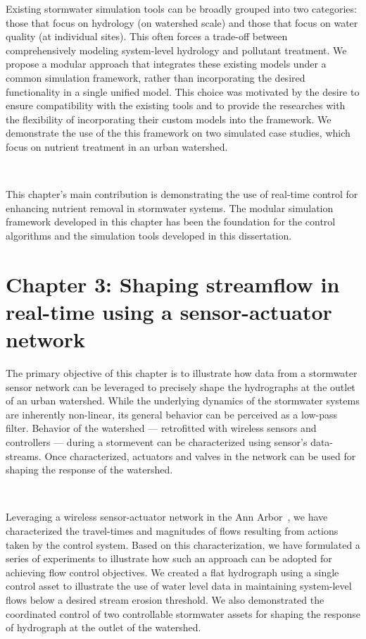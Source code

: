 Existing stormwater simulation tools can be broadly grouped into two categories: those that focus on hydrology (on watershed scale) and those that focus on water quality (at individual sites).
This often forces a trade-off between comprehensively modeling system-level hydrology and pollutant treatment.
We propose a modular approach that integrates these existing models under a common simulation framework, rather than incorporating the desired functionality in a single unified model.
This choice was motivated by the desire to ensure compatibility with the existing tools and to provide the researches with the flexibility of incorporating their custom models into the framework.
We demonstrate the use of the this framework on two simulated case studies, which focus on nutrient treatment in an urban watershed.

\

This chapter's main contribution is demonstrating the use of real-time control for enhancing nutrient removal in stormwater systems. The modular simulation framework developed in this chapter has been the foundation for the control algorithms and the simulation tools developed in this dissertation. 

\section{Chapter 3: Shaping streamflow in real-time using a sensor-actuator network}

The primary objective of this chapter is to illustrate how data from a stormwater sensor network can be leveraged to precisely shape the hydrographs at the outlet of an urban watershed.
While the underlying dynamics of the stormwater systems are inherently non-linear, its general behavior can be perceived as a low-pass filter.
Behavior of the watershed --- retrofitted with wireless sensors and controllers --- during a stormevent can be characterized using sensor's data-streams.
Once characterized, actuators and valves in the network can be used for shaping the response of the watershed.

\

Leveraging a wireless sensor-actuator network in the Ann Arbor~\cite{Bartos_2018}, we have characterized the travel-times and magnitudes of flows resulting from actions taken by the control system.
Based on this characterization, we have formulated a series of experiments to illustrate how such an approach can be adopted for achieving flow control objectives.
We created a flat hydrograph using a single control asset to illustrate the use of water level data in maintaining system-level flows below a desired stream erosion threshold.
We also demonstrated the coordinated control of two controllable stormwater assets for shaping the response of hydrograph at the outlet of the watershed.

